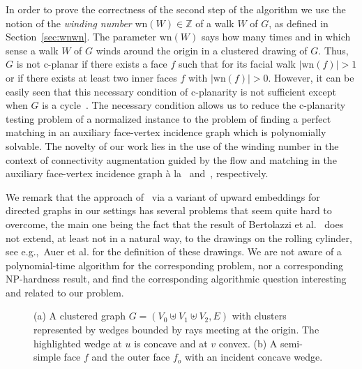 \documentclass{llncs}
\def\cNP{\hbox{\rm \sffamily NP}}
\def\wn{\mathrm{wn}}
\begin{document}
In order to prove the correctness of the second step of the algorithm
we use the notion of the \emph{winding number} $\wn(W)\in \mathbb{Z}$ of a walk $W$ of $G$, as defined
in Section~\ref{sec:wnwn}. The parameter $\wn(W)$ says how many times and in which sense 
a walk $W$ of $G$ winds around the origin in a clustered drawing of $G$.
Thus, $G$ is not c-planar if there exists a face $f$ such that for its facial walk $|\wn(f)|>1$ or
if there exists at least two inner faces $f$ with $|\wn(f)|>0$.
However, it can be easily seen that this necessary condition of c-planarity is not sufficient
except when $G$ is a cycle~\cite{CDPP05}.
The  necessary condition allows us to reduce the c-planarity testing problem of a normalized instance to the problem
of finding a perfect matching in an auxiliary face-vertex incidence graph which is polynomially solvable.
The novelty of our work lies in the use of the winding number in the context of connectivity augmentation guided
by the flow and matching in the auxiliary face-vertex incidence graph \`a la~\cite{ADDF13} and~\cite{F14+}, respectively. 

We remark that the approach of~\cite{ADDF13} via a variant of upward embeddings
for directed graphs in our settings has several problems that seem quite hard to overcome,
the main one being the fact that the result of Bertolazzi et al.~\cite{BBLM94} does not extend, at least not in a natural way, to the drawings on the rolling cylinder, see e.g.,~Auer et al.\cite{Auer201536} for the definition of these drawings.
We are not aware of a polynomial-time algorithm for the corresponding  problem,
nor a corresponding \cNP-hardness result, and
find the corresponding algorithmic question interesting and related to our problem. 

\begin{figure}
  \centering
\centering
\subfloat[]{
\label{fig:wedges}
\texttt{[image: 3ex]}
    	}
    	\hspace{10px}
\caption{(a) A clustered graph $G=(V_0 \uplus V_1 \uplus V_2,E)$ with clusters represented by wedges bounded by rays meeting at the origin. The highlighted wedge at $u$ is concave and at $v$ convex. (b) A semi-simple face $f$
and the outer face $f_o$ with an incident concave wedge.}
\end{figure}
\end{document}
